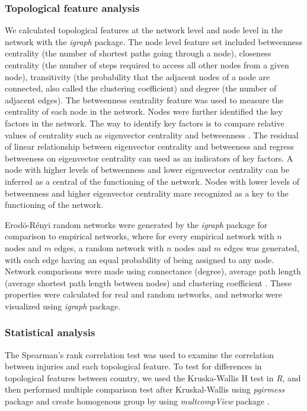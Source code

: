 \subsubsection{Topological feature analysis}

We calculated topological features at the network level and node level in the network with the \textit{igraph} package. The node level feature set included betweenness centrality (the number of shortest paths going through a node), closeness centrality (the number of steps required to access all other nodes from a given node), transitivity (the probability that the adjacent nodes of a node are connected, also called the clustering coefficient) and degree (the number of adjacent edges). The betweenness centrality feature was used to measure the centrality of each node in the network. Nodes were further identified the key factors in the network. The way to identify key factors is to compare relative values of centrality such as eigenvector centrality and betweenness \cite{Valente_2008_How}. The residual of linear relationship between eigenvector centrality and betweeness and regress betweeness on eigenvector centrality can used as an indicators of key factors. A node with higher levels of betweenness and lower eigenvector centrality can be inferred as a central of the functioning of the network. Nodes with lower levels of betweenness and higher eigenvector centrality mare recognized as a key to the functioning of the network. 

Erod\"{o}-R\'{e}nyi random networks were generated by the \textit{igraph} package for comparison to empirical networks, where for every empirical network with $n$ nodes and $m$ edges, a random network with $n$ nodes and $m$ edges was generated, with each edge having an equal probability of being assigned to any node. Network comparisons were made using connectance (degree),  average path length (average shortest path length between nodes) and clustering coefficient \citep{Kolaczyk_2014_Statistical}. These properties were calculated for real and random networks, and networks were visualized using \textit{igraph} package. 
 
\subsubsection{Statistical analysis}
The Spearman’s rank correlation test was used to examine the correlation between injuries and each topological feature.  To test for differences in topological features between country, we used the Kruska-Wallis H test in \textit{R}, and then performed multiple comparison test after Kruskal-Wallis using \textit{pgirmess} package \citep{Giraudoux_2012_pgirmess} and create homogenous group by using \textit{multcompView} package \citep{Spencer_2015_multcompView}.





